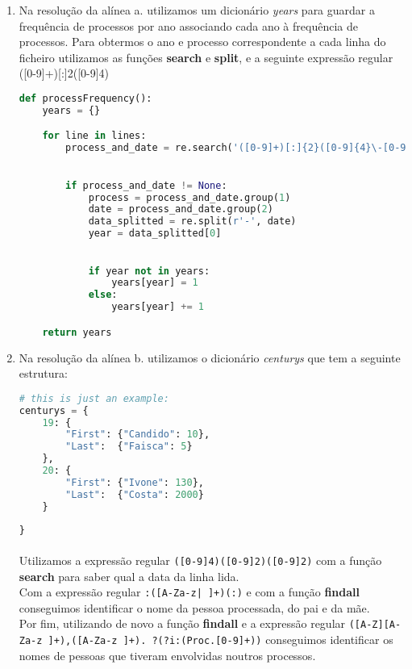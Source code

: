 \documentclass[11pt,a4paper]{report}
\begin{document}
    \begin{enumerate}[label=\alph*.]
        \item Na resolução da alínea a. utilizamos um dicionário \textit{years} para guardar a frequência de processos por ano associando cada ano à frequência de processos. Para obtermos o ano e processo correspondente a cada linha do ficheiro utilizamos as funções \textbf{search} e \textbf{split}, e a seguinte expressão regular ([0-9]+)[:]{2}([0-9]{4}) \\
        \begin{lstlisting}[language=Python]
def processFrequency():
    years = {}

    for line in lines:
        process_and_date = re.search('([0-9]+)[:]{2}([0-9]{4}\-[0-9]{2}\-[0-9]{2})', line)
    

        if process_and_date != None:
            process = process_and_date.group(1)
            date = process_and_date.group(2)
            data_splitted = re.split(r'-', date)
            year = data_splitted[0]

        
            if year not in years:
                years[year] = 1
            else:
                years[year] += 1

    return years
        \end{lstlisting}

        \item Na resolução da alínea b. utilizamos o dicionário \textit{centurys} que tem a seguinte estrutura:
        \begin{lstlisting}[language=Python]
# this is just an example:
centurys = {
    19: {
        "First": {"Candido": 10},
        "Last":  {"Faisca": 5}
    },
    20: {
        "First": {"Ivone": 130},
        "Last":  {"Costa": 2000}
    }
    
}
        \end{lstlisting}

        \paragraph{}
        Utilizamos a expressão regular \texttt{([0-9]{4})\-([0-9]{2})\-([0-9]{2})} com a função \textbf{search} para saber qual a data da linha lida.\\ Com a expressão regular \texttt{:([A-Za-z| ]+)(:)} e com a função \textbf{findall} conseguimos identificar o nome da pessoa processada, do pai e da mãe.\\Por fim, utilizando de novo a função \textbf{findall} e a expressão regular \texttt{([A-Z][A-Za-z ]+),([A-Za-z ]+). ?(?i:(Proc.[0-9]+))} conseguimos  identificar os nomes de pessoas que tiveram envolvidas noutros processos.


\end{enumerate}
\end{document}
